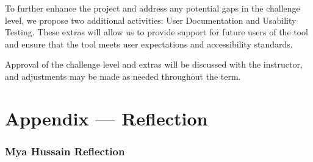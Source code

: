 \documentclass{article}
\begin{document}
To further enhance the project and address any potential gaps in the challenge level, 
we propose two additional activities: User Documentation and Usability Testing. 
These extras will allow us to provide support for future users of the tool and 
ensure that the tool meets user expectations and accessibility standards. 

Approval of the challenge level and extras will be discussed with the instructor, 
and adjustments may be made as needed throughout the term.

\newpage{}

\section*{Appendix --- Reflection}




\subsubsection*{Mya Hussain Reflection}
\end{document}
